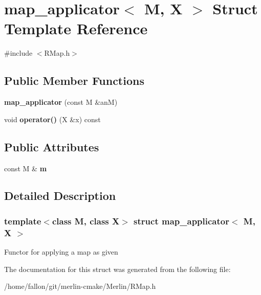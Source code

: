\hypertarget{structmap__applicator}{}\section{map\+\_\+applicator$<$ M, X $>$ Struct Template Reference}
\label{structmap__applicator}


{\ttfamily \#include $<$R\+Map.\+h$>$}

\subsection*{Public Member Functions}
\begin{DoxyCompactItemize}
\item 
\mbox{\label{structmap__applicator_a931ec15cffc2fc726c32f66bf6235420}} 
{\bfseries map\+\_\+applicator} (const M \&anM)
\item 
\mbox{\label{structmap__applicator_ae4ad9e94b78307e46eb81cd0162cadce}} 
void {\bfseries operator()} (X \&x) const
\end{DoxyCompactItemize}
\subsection*{Public Attributes}
\begin{DoxyCompactItemize}
\item 
\mbox{\label{structmap__applicator_ab1d780ee888e0863f08cc76d44c4116b}} 
const M \& {\bfseries m}
\end{DoxyCompactItemize}


\subsection{Detailed Description}
\subsubsection*{template$<$class M, class X$>$\newline
struct map\+\_\+applicator$<$ M, X $>$}

Functor for applying a map as given 

The documentation for this struct was generated from the following file\+:\begin{DoxyCompactItemize}
\item 
/home/fallon/git/merlin-\/cmake/\+Merlin/R\+Map.\+h\end{DoxyCompactItemize}
